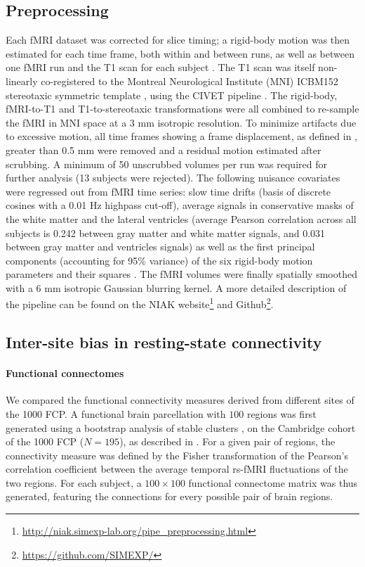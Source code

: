 \documentclass[authoryear]{elsarticle}
\begin{document}
\subsection{Preprocessing}
Each fMRI dataset was corrected for slice timing; a rigid-body motion was then estimated for each time frame, both within and between runs, as well as between one fMRI run and the T1 scan for each subject \citep{Collins1994}. The T1 scan was itself non-linearly co-registered to the Montreal Neurological Institute (MNI) ICBM152 stereotaxic symmetric template \citep{Fonov2011}, using the CIVET pipeline \citep{Ad-Dab'bagh2006}. The rigid-body, fMRI-to-T1 and T1-to-stereotaxic transformations were all combined to re-sample the fMRI in MNI space at a 3 mm isotropic resolution. To minimize artifacts due to excessive motion, all time frames showing a frame displacement, as defined in \cite{Power2012}, greater than 0.5 mm were removed and a residual motion estimated after scrubbing. A minimum of 50 unscrubbed volumes per run was required for further analysis (13 subjects were rejected). The following nuisance covariates were regressed out from fMRI time series: slow time drifts (basis of discrete cosines with a 0.01 Hz highpass cut-off), average signals in conservative masks of the white matter and the lateral ventricles (average Pearson correlation across all subjects is 0.242  between gray matter and white matter signals, and 0.031 between gray matter and ventricles signals) as well as the first principal components (accounting for 95\% variance) of the six rigid-body motion parameters and their squares \citep{Giove2009,Lund2006}. The fMRI volumes were finally spatially smoothed with a 6 mm isotropic Gaussian blurring kernel. A more detailed description of the pipeline can be found on the NIAK website\footnote{\url{http://niak.simexp-lab.org/pipe_preprocessing.html}} and Github\footnote{\url{https://github.com/SIMEXP/}}.

\subsection{Inter-site bias in resting-state connectivity}
\paragraph{Functional connectomes} We compared the functional connectivity measures derived from different sites of the 1000 FCP. A functional brain parcellation with $100$ regions was first generated using a bootstrap analysis of stable clusters \citep{Bellec2010c}, on the Cambridge cohort of the 1000 FCP ($N=195$), as described in \cite{Orban2015}. For a given pair of regions, the connectivity measure was defined by the Fisher transformation of the Pearson's correlation coefficient between the average temporal rs-fMRI fluctuations of the two regions. For each subject, a $100 \times 100$ functional connectome matrix was thus generated, featuring the connections for every possible pair of brain regions. 
\end{document}
